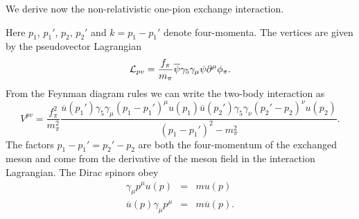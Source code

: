\documentclass[graybox,sectrefs,envcountresetchap,open=right]{svmonodo}
\begin{document}
\noindent
We derive now the non-relativistic one-pion exchange interaction.

\noindent
Here $p_{1}$, $p_{1}'$, $p_{2}$, $p_{2}'$ and $k=p_{1}-p_{1}'$ denote 
four-momenta.  
The vertices are 
given by the pseudovector Lagrangian
\[
{\cal L}_{pv}=\frac{f_{\pi}}{m_{\pi}}\overline{\psi}\gamma_{5}\gamma_{\mu}
\psi\partial^{\mu}\phi_{\pi}.
\]
 From the Feynman diagram rules we can write the two-body interaction as  
\[
V^{pv}=\frac{f_{\pi}^{2}}{m_{\pi}^{2}}\frac{\overline{u}(p_{1}')\gamma_{5}
\gamma_{\mu}(p_{1}-p_{1}')^{\mu}u(p_{1})\overline{u}(p_{2}')\gamma_{5}
\gamma_{\nu}(p_{2}'-p_{2})^{\nu}u(p_{2})}{(p_{1}-p_{1}')^{2}-m_{\pi}^{2}}.
\]
The factors $p_{1}-p_{1}'=p_{2}'-p_{2}$ are both the four-momentum of the 
exchanged meson and come from the derivative of the meson field in 
the interaction Lagrangian. 
The Dirac spinors obey 
\begin{eqnarray*}
\gamma_{\mu}p^{\mu}u(p)&=&mu(p) \nonumber \\
\overline{u}(p)\gamma_{\mu}p^{\mu}&=&m\overline{u}(p). \nonumber
\end{eqnarray*} 
\end{document}
